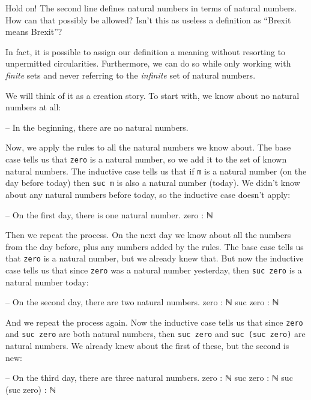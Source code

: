 Hold on! The second line defines natural numbers in terms of natural
numbers. How can that possibly be allowed? Isn't this as useless a
definition as ``Brexit means Brexit''?

In fact, it is possible to assign our definition a meaning without
resorting to unpermitted circularities. Furthermore, we can do so while
only working with \emph{finite} sets and never referring to the
\emph{infinite} set of natural numbers.

We will think of it as a creation story. To start with, we know about no
natural numbers at all:

\begin{myDisplay}
-- In the beginning, there are no natural numbers.
\end{myDisplay}

Now, we apply the rules to all the natural numbers we know about. The
base case tells us that \texttt{zero} is a natural number, so we add it
to the set of known natural numbers. The inductive case tells us that if
\texttt{m} is a natural number (on the day before today) then
\texttt{suc\ m} is also a natural number (today). We didn't know about
any natural numbers before today, so the inductive case doesn't apply:

\begin{myDisplay}
-- On the first day, there is one natural number.
zero : ℕ
\end{myDisplay}

Then we repeat the process. On the next day we know about all the
numbers from the day before, plus any numbers added by the rules. The
base case tells us that \texttt{zero} is a natural number, but we
already knew that. But now the inductive case tells us that since
\texttt{zero} was a natural number yesterday, then \texttt{suc\ zero} is
a natural number today:

\begin{myDisplay}
-- On the second day, there are two natural numbers.
zero : ℕ
suc zero : ℕ
\end{myDisplay}

And we repeat the process again. Now the inductive case tells us that
since \texttt{zero} and \texttt{suc\ zero} are both natural numbers,
then \texttt{suc\ zero} and \texttt{suc\ (suc\ zero)} are natural
numbers. We already knew about the first of these, but the second is
new:

\begin{myDisplay}
-- On the third day, there are three natural numbers.
zero : ℕ
suc zero : ℕ
suc (suc zero) : ℕ
\end{myDisplay}

